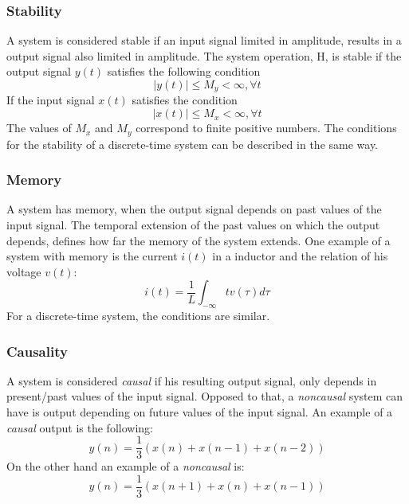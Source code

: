 \subsubsection*{Stability}
A system is considered stable if an input signal limited in amplitude, results in a output signal also limited in amplitude. The system operation, H, is stable if the output signal $y(t)$  satisfies the following condition
\begin{equation}
    |y(t)|\leq M_y < \infty , \forall t
\end{equation}
If the input signal $x(t)$ satisfies the condition
\begin{equation}
    |x(t)|\leq M_x < \infty , \forall t
\end{equation}
The values of $M_x$ and $M_y$ correspond to finite positive numbers. The conditions for the stability of a discrete-time system can be described in the same way.
\subsubsection*{Memory}
A system has memory, when the output signal depends on past values of the input signal. The temporal extension of the past values on which the output depends, defines how far the memory of the system extends. One example of a system with memory is the current $i(t)$ in a inductor and the relation of his voltage $v(t)$:
\begin{equation}
    i(t)=\frac{1}{L}\int_{-\infty}{t}v(\tau)d\tau
\end{equation}
For a discrete-time system, the conditions are similar. 
\subsubsection*{Causality}
A system is considered \textit{causal} if his resulting output signal, only depends in present/past values of the input signal. Opposed to that, a \textit{noncausal} system can have is output depending on future values of the input signal.
An example of a \textit{causal} output is the following:
\begin{equation}
    y(n) = \frac{1}{3}(x(n)+x(n-1)+x(n-2))
\end{equation}
On the other hand an example of a \textit{noncausal} is:
\begin{equation}
    y(n) = \frac{1}{3}(x(n+1)+x(n)+x(n-1))
\end{equation}
